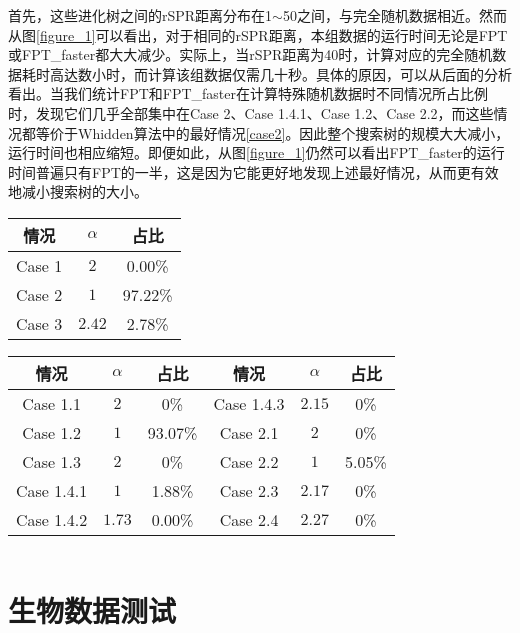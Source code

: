 
首先，这些进化树之间的rSPR距离分布在1$\sim$50之间，与完全随机数据相近。然而从图\ref{figure_1}可以看出，对于相同的rSPR距离，本组数据的运行时间无论是FPT或FPT\_faster都大大减少。实际上，当rSPR距离为40时，计算对应的完全随机数据耗时高达数小时，而计算该组数据仅需几十秒。具体的原因，可以从后面的分析看出。当我们统计FPT和FPT\_faster在计算特殊随机数据时不同情况所占比例时，发现它们几乎全部集中在Case 2、Case 1.4.1、Case 1.2、Case 2.2，而这些情况都等价于Whidden算法中的最好情况\ref{case2}。因此整个搜索树的规模大大减小，运行时间也相应缩短。即便如此，从图\ref{figure_1}仍然可以看出FPT\_faster的运行时间普遍只有FPT的一半，这是因为它能更好地发现上述最好情况，从而更有效地减小搜索树的大小。


\begin{center}
\begin{table}[htpb]
\parbox{.34\linewidth}{
\centering
{}
\begin{tabular}{ c c c}
  \hline
      情况 & $\alpha$ & 占比\\  \hline
      Case 1 & $2$ & 0.00\% \\
      Case 2 & $1$ & 97.22\%\\
      Case 3 & $2.42$ & 2.78\% \\
  \hline
\end{tabular}
}
\hfill
\parbox{.6\linewidth}{
\centering
{}
\begin{tabular}{ c c c | c c c }
  \hline
      情况 & $\alpha$ & 占比 & 情况 & $\alpha$ & 占比\\  \hline
      Case 1.1 & $2$ & 0\% & Case 1.4.3 & $2.15$ &0\%  \\
      Case 1.2 & $1$ & 93.07\% & Case 2.1 & $2$ & 0\% \\
      Case 1.3 & $2$ & 0\% & Case 2.2 & $1$ & 5.05\% \\
      Case 1.4.1 & $1$ & 1.88\%  & Case 2.3 & $2.17$ & 0\% \\
      Case 1.4.2 & $1.73$ & 0.00\% & Case 2.4 & $2.27$ & 0\% \\
  \hline
\end{tabular}
}
\end{table}
\end{center}

$ $\\
\section{生物数据测试}

